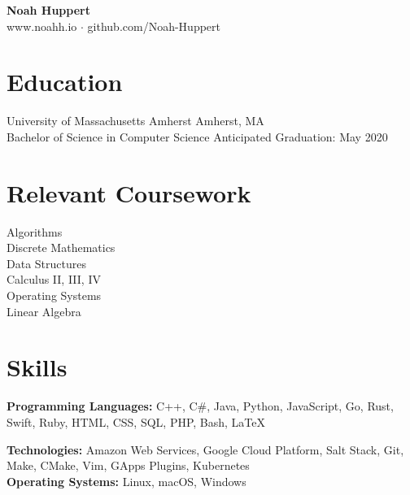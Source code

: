 \documentclass[10pt]{article}
\begin{document}

\centering
	\textbf{Noah Huppert} \\
	
	www.noahh.io $\cdot$ github.com/Noah-Huppert


\begin{flushleft}

\section{Education}
	University of Massachusetts Amherst \hfill Amherst, MA \\
	Bachelor of Science in Computer Science \hfill Anticipated Graduation: May 2020 \\

\section{Relevant Coursework}
	\begin{addmargin}[1em]{1em}
	\begin{multicols}{3}
		Algorithms \\
		Discrete Mathematics \\

		Data Structures \\
		Calculus II, III, IV \\

		Operating Systems \\
		Linear Algebra 
	\end{multicols} 
	\end{addmargin}


\section{Skills}
	\textbf{Programming Languages:} C++, C\#, Java, Python, JavaScript, Go, Rust, Swift, Ruby, HTML, CSS, SQL, PHP,
		Bash, LaTeX

	\textbf{Technologies:} Amazon Web Services, Google Cloud Platform, Salt Stack, Git, Make, CMake, Vim,
		GApps Plugins, Kubernetes \\

	\textbf{Operating Systems:} Linux, macOS, Windows


\end{flushleft}
\end{document}
